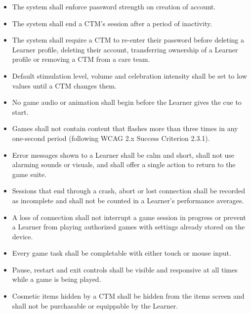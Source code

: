 \documentclass[12pt]{article}
\begin{document}
\begin{itemize}
    \item[\textbf{SR-1}\phantomsection\label{SR-1}] The system shall enforce password strength on creation of account.
    \item[\textbf{SR-2.}\phantomsection\label{SR-2}] The system shall end a CTM's session after a period of inactivity.
    \item[\textbf{SR-3.}\phantomsection\label{SR-3}] The system shall require a CTM to re-enter their password before deleting a Learner profile, deleting their account, transferring ownership of a Learner profile or removing a CTM from a care team.
    \item[\textbf{SR-4.}\phantomsection\label{SR-4}] Default stimulation level, volume and celebration intensity shall be set to low values until a CTM changes them.
    \item[\textbf{SR-5.}\phantomsection\label{SR-5}] No game audio or animation shall begin before the Learner gives the cue to start.
    \item[\textbf{SR-6.}\phantomsection\label{SR-6}] Games shall not contain content that flashes more than three times in any one-second period (following WCAG 2.x Success Criterion 2.3.1).
    \item[\textbf{SR-7.}\phantomsection\label{SR-7}] Error messages shown to a Learner shall be calm and short, shall not use alarming sounds or visuals, and shall offer a single action to return to the game suite.
    \item[\textbf{SR-8.}\phantomsection\label{SR-8}] Sessions that end through a crash, abort or lost connection shall be recorded as incomplete and shall not be counted in a Learner's performance averages.
    \item[\textbf{SR-9.}\phantomsection\label{SR-9}] A loss of connection shall not interrupt a game session in progress or prevent a Learner from playing authorized games with settings already stored on the device.
    \item[\textbf{SR-10.}\phantomsection\label{SR-10}] Every game task shall be completable with either touch or mouse input.
    \item[\textbf{SR-11.}\phantomsection\label{SR-11}] Pause, restart and exit controls shall be visible and responsive at all times while a game is being played.
    \item[\textbf{SR-12.}\phantomsection\label{SR-12}] Cosmetic items hidden by a CTM shall be hidden from the items screen and shall not be purchasable or equippable by the Learner.

\end{itemize}
\end{document}
